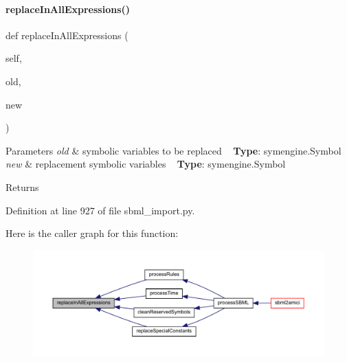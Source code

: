 \paragraph{\texorpdfstring{replace\+In\+All\+Expressions()}{replaceInAllExpressions()}}
{\footnotesize\ttfamily def replace\+In\+All\+Expressions (\begin{DoxyParamCaption}\item[{}]{self,  }\item[{}]{old,  }\item[{}]{new }\end{DoxyParamCaption})}


\begin{DoxyParams}{Parameters}
{\em old} & symbolic variables to be replaced ~\newline
{\bfseries Type}\+: symengine.\+Symbol\\
\hline
{\em new} & replacement symbolic variables ~\newline
{\bfseries Type}\+: symengine.\+Symbol\\
\hline
\end{DoxyParams}
\begin{DoxyReturn}{Returns}

\end{DoxyReturn}


Definition at line 927 of file sbml\+\_\+import.\+py.

Here is the caller graph for this function\+:
\nopagebreak
\begin{figure}[H]
\begin{center}
\leavevmode
\includegraphics[width=350pt]{classamici_1_1sbml__import_1_1_sbml_importer_a1579faf8b188de11ed58ddbebc3c20a7_icgraph}
\end{center}
\end{figure}
\mbox{\label{classamici_1_1sbml__import_1_1_sbml_importer_a122b9921e2fb5bd0fc75310c47413dd1}} 
